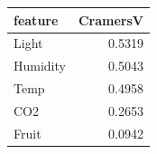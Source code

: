 \begin{tabular}{lr}
\toprule
feature & CramersV \\
\midrule
Light & 0.5319 \\
Humidity & 0.5043 \\
Temp & 0.4958 \\
CO2 & 0.2653 \\
Fruit & 0.0942 \\
\bottomrule
\end{tabular}

